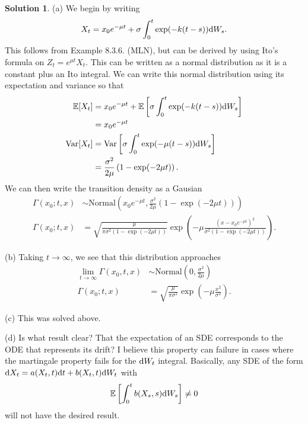 \documentclass[12pt]{article}
\newcommand{\Expect}{\mathbb{E}}
\newcommand{\Var}{\text{Var}}
\theoremstyle{definition}
\newtheorem{sol}{Solution}
\theoremstyle{remark}
\def\d{{\rm d}}
\begin{document}
\begin{sol}
    (a) We begin by writing
    \begin{align*}
        X_{t} = x_{0} e^{-\mu t} +  \sigma \int_{0}^{t} \exp(-k(t-s)) \d W_{s}.
    \end{align*}
    This follows from Example 8.3.6. (MLN), but can be derived by using Ito's formula on $Z_{t} = e^{\mu t} X_{t}$. This can be written as a normal distribution as it is a constant plus an Ito integral. We can write this normal distribution using its expectation and variance so that
    \begin{align*}
        \Expect[ X_{t} ] &= x_{0} e^{-\mu t}  + \Expect \left[  \sigma \int_{0}^{t} \exp(-k(t-s)) \d W_{s} \right]\\
                         &=  x_{0} e^{-\mu t}\\
        \Var[X_{t}] &= \Var\left[  \sigma \int_{0}^{t} \exp(- \mu (t-s)) \d W_{s} \right]\\
                    &= \frac{\sigma^{2}}{2\mu} \left(1 - \exp(-2 \mu t)\right). 
    \end{align*}
    We can then write the transition density as a Gausian 
    \begin{align*}
        \Gamma(x_{0}; t, x) &\sim \text{Normal}\left( x_{0} e^{-\mu t}, \frac{\sigma^{2}}{2\mu} \left(1 - \exp(-2 \mu t)\right)  \right)\\
        \Gamma(x_{0}; t, x) &= \sqrt{\frac{\mu}{\pi \sigma^{2} (1 - \exp(-2 \mu t))}} \exp\left( -\mu\frac{(x - x_{0}e^{-\mu t})^{2} }{\sigma^{2} (1 - \exp(-2\mu t))} \right).
    \end{align*}

    (b) Taking $t \to \infty$, we see that this distribution approaches
    \begin{align*}
        \lim_{t\to \infty} \Gamma(x_{0}, t, x)  &\sim \text{Normal}\left(0, \frac{\sigma^{2}}{2\mu}\right) \\
        \Gamma(x_{0}; t, x) &= \sqrt{\frac{\mu}{\pi \sigma^{2}}} \exp\left( -\mu\frac{x^{2}}{\sigma^{2} }\right).
    \end{align*}

    (c) This was solved above.

    (d) Is what result clear? That the expectation of an SDE corresponds to the ODE that represents its drift? I believe this property can failure in cases where the martingale property fails for the $\d W_{t}$ integral. Basically, any SDE  of the form $\d X_{t} = a(X_{t}, t) \d t + b(X_{t}, t) \d W_{t}$ with
\begin{align*}
    \Expect \left[\int_{0}^{t} b(X_{s}, s)  \d W_{s} \right] \neq 0
\end{align*}
will not have the desired result.
\end{sol}
\end{document}
